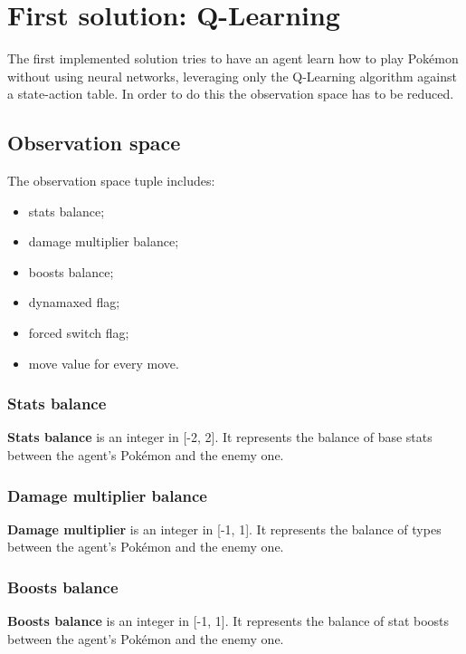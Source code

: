 \documentclass{article}
\begin{document}
\section{First solution: Q-Learning} \label{sarsa_results}

The first implemented solution tries to have an agent learn how to play Pokémon without using neural networks, leveraging only the Q-Learning algorithm against a state-action table.
In order to do this the observation space has to be reduced.

\subsection{Observation space}

The observation space tuple includes:
\begin{itemize}
    \item stats balance;
    \item damage multiplier balance;
    \item boosts balance;
    \item dynamaxed flag;
    \item forced switch flag;
    \item move value for every move.
\end{itemize}

\subsubsection{Stats balance}

\textbf{Stats balance} is an integer in [-2, 2].
It represents the balance of base stats between the agent's Pokémon and the enemy one.

\subsubsection{Damage multiplier balance}

\textbf{Damage multiplier} is an integer in [-1, 1].
It represents the balance of types between the agent's Pokémon and the enemy one.

\subsubsection{Boosts balance}

\textbf{Boosts balance} is an integer in [-1, 1].
It represents the balance of stat boosts between the agent's Pokémon and the enemy one.
\end{document}
